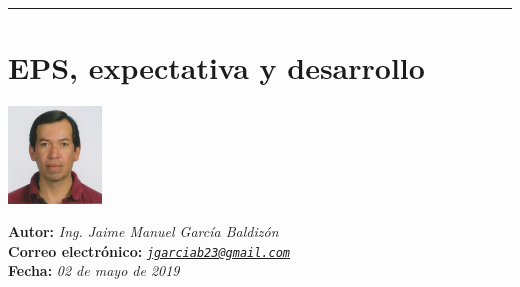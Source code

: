 \documentclass[12pt,spanish,Letterpaper,openany]{book}
\newcommand{\tcolorboxcommand}{\begin{tcolorbox}[sharp corners=uphill, colback=newfondo, colframe=newfondo, arc=6mm, boxrule=0mm, boxsep=0mm]}
\newcommand{\HRule}{\begin{center}\rule{0.5\linewidth}{0.2mm}\end{center}}
\begin{document}
\medskip

\HRule

\medskip

\hypertarget{jgarcia}{%
\chapter{EPS, expectativa y desarrollo}\label{jgarcia}}

\begin {flushleft}

\tcolorboxcommand

\begin{minipage}[c]{3cm}

\includegraphics[width=2.5cm,height=\textheight]{images/image01_jgarcia.jpg}

\end{minipage}\begin{minipage}[c]{12cm}

\textbf{Autor:} \emph{Ing. Jaime Manuel García Baldizón}\\
\textbf{Correo electrónico:} \emph{\href{mailto:jgarciab23@gmail.com}{\nolinkurl{jgarciab23@gmail.com}}}\\
\textbf{Fecha:} \emph{02 de mayo de 2019}

\end{minipage}

\end {tcolorbox}

\end {flushleft}
\end{document}
